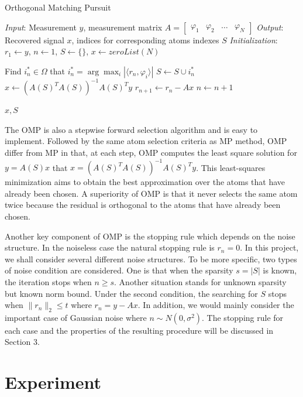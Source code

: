 \documentclass{ucsdreport}
\begin{document}
\begin{algorithm}
\caption{Orthogonal Matching Pursuit}\label{OMP}

\BState \emph{Input}: Measurement $y$, measurement matrix $A=\begin{bmatrix}\varphi_1&\varphi_2&\dots&\varphi_N\end{bmatrix}$
\BState \emph{Output}: Recovered signal $x$, indices for corresponding atoms indexes $S$
\BState \emph{Initialization}: $r_1\gets y$, $n\gets 1$, $S \gets \{\}$, $x \gets zeroList(N)$

\begin{algorithmic}[1]
    \State Find $i^*_n \in \Omega$ that $i^*_n=\arg\max_i |\langle r_n,\varphi_i \rangle| $
    \State $S \gets S \cup i^*_n$
    \State $x \gets (A(S)^TA(S))^{-1}A(S)^Ty$
    \State $r_{n+1} \gets r_{n} - Ax$
    \State $n \gets n+1$
    
    \State \Return $x,S$
\end{algorithmic}
\end{algorithm}
The OMP is also a stepwise forward selection algorithm and is easy to implement. Followed by the same atom selection criteria as MP method, OMP differ from MP in that, at each step, OMP computes the least square solution for $y=A(S)x$ that $x = (A(S)^TA(S))^{-1}A(S)^Ty$. This least-squares minimization aims to obtain the best approximation over the atoms that have already been chosen. A superiority of OMP is that it never selects the same atom twice because the residual is orthogonal to the atoms that have already been chosen.

Another key component of OMP is the stopping rule which depends on the noise structure. In the noiseless case the natural stopping rule is $r_n=0$. In this project, we shall consider several different noise structures\cite{cai2011orthogonal}. To be more specific, two types of noise condition are considered. One is that when the sparsity $s=|S|$ is known, the iteration stops when $n \geq s$. Another situation stands for unknown sparsity but known norm bound. Under the second condition, the searching for $S$ stops when $\|r_n\|_2 \leq t$ where $r_n=y-Ax$. In
addition, we would mainly consider the important case of Gaussian
noise where $n \sim N(0,\sigma^2)$. The stopping rule for each case
and the properties of the resulting procedure will be discussed
in Section 3.
\section{Experiment}
\end{document}
